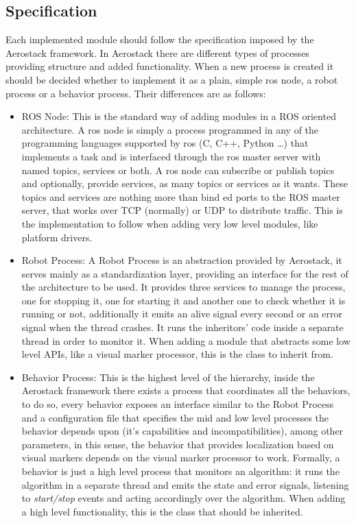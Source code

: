   \subsection{Specification} \label{ch_4:subsect:specs}

    Each implemented module should follow the specification imposed by the Aerostack framework. In Aerostack there are different types of processes providing structure and added functionality. When a new process is created it should be decided whether to implement it as a plain, simple ros node, a robot process or a behavior process. Their differences are as follows:

    \begin{itemize}
      \item ROS Node: This is the standard way of adding modules in a ROS oriented architecture. A ros node is simply a process programmed in any of the programming languages supported by ros (C, C++, Python \dots) that implements a task and is interfaced through the ros master server with named topics, services or both. A ros node can subscribe or publish topics and optionally, provide services, as many topics or services as it wants. These topics and services are nothing more than bind ed ports to the ROS master server, that works over TCP (normally) or UDP to distribute traffic. This is the implementation to follow when adding very low level modules, like platform drivers.
      \item Robot Process: A Robot Process is an abstraction provided by Aerostack, it serves mainly as a standardization layer, providing an interface for the rest of the architecture to be used. It provides three services to manage the process, one for stopping it, one for starting it and another one to check whether it is running or not, additionally it emits an alive signal every second or an error signal when the thread crashes. It runs the inheritors' code inside a separate thread in order to monitor it. When adding a module that abstracts some low level APIs, like a visual marker processor, this is the class to inherit from.
      \item Behavior Process: This is the highest level of the hierarchy, inside the Aerostack framework there exists a process that coordinates all the behaviors, to do so, every behavior exposes an interface similar to the Robot Process and a configuration file that specifies the mid and low level processes the behavior depends upon (it's capabilities and incompatibilities), among other parameters, in this sense, the behavior that provides localization based on visual markers depends on the visual marker processor to work. Formally, a behavior is just a high level process that monitors an algorithm: it runs the algorithm in a separate thread and emits the state and error signals, listening to \textit{start/stop} events and acting accordingly over the algorithm. When adding a high level functionality, this is the class that should be inherited.
    \end{itemize}

